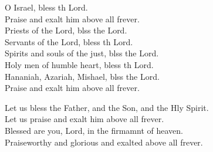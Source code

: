 \begin{psalmverse}
\begin{patverse}
O Israel, bless th Lord.\Med\\
Praise and exalt him above all frever.\\
Priests of the Lord, blss the Lord.\Med\\
Servants of the Lord, bless th Lord.\\
Spirits and souls of the just, blss the Lord.\Med\\
Holy men of humble heart, bless th Lord.\\
Hananiah, Azariah, Mishael, blss the Lord.\Med\\
Praise and exalt him above all frever.

Let us bless the Father, and the Son, and the Hly Spirit.\Med\\
Let us praise and exalt him above all frever.\\
Blessed are you, Lord, in the firmamnt of heaven.\Med\\
Praiseworthy and glorious and exalted above all frever.
  \end{patverse}
\end{psalmverse}
